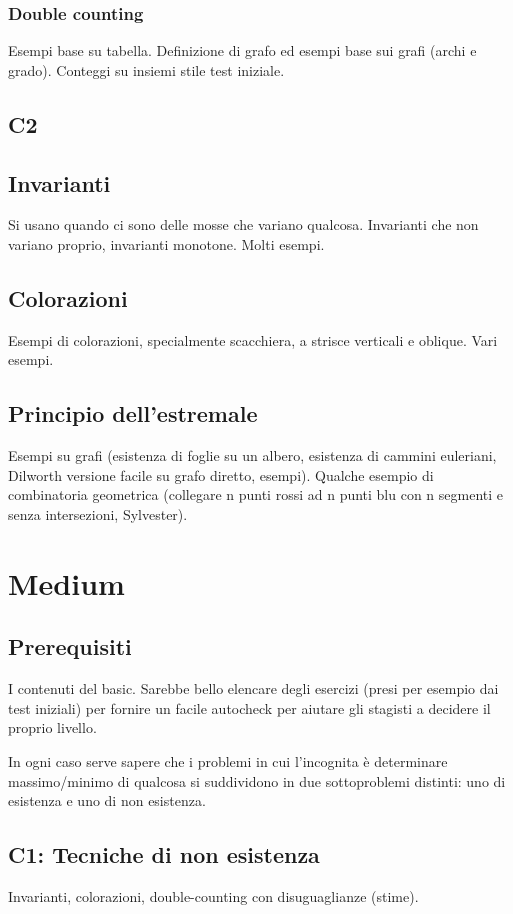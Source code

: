 \documentclass[a4paper,10pt]{article}
\begin{document}
\subsubsection{Double counting}
Esempi base su tabella. Definizione di grafo ed esempi base sui grafi (archi e grado). Conteggi su insiemi stile test iniziale.

\subsection{C2}
\subsection{Invarianti}
Si usano quando ci sono delle mosse che variano qualcosa. Invarianti che non variano proprio, invarianti monotone. Molti esempi.

\subsection{Colorazioni}
Esempi di colorazioni, specialmente scacchiera, a strisce verticali e oblique. Vari esempi.

\subsection{Principio dell'estremale}
Esempi su grafi (esistenza di foglie su un albero, esistenza di cammini euleriani, Dilworth versione facile su grafo diretto, esempi). Qualche esempio di combinatoria geometrica (collegare n punti rossi ad n punti blu con n segmenti e senza intersezioni, Sylvester).



\section{Medium}
\subsection{Prerequisiti}
I contenuti del basic. Sarebbe bello elencare degli esercizi (presi per esempio dai test iniziali) per fornire un facile autocheck per aiutare gli stagisti a decidere il proprio livello.

In ogni caso serve sapere che i problemi in cui l'incognita è determinare massimo/minimo di qualcosa si suddividono in due sottoproblemi distinti: uno di esistenza e uno di non esistenza.


\subsection{C1: Tecniche di non esistenza}
Invarianti, colorazioni, double-counting con disuguaglianze (stime).
\end{document}
